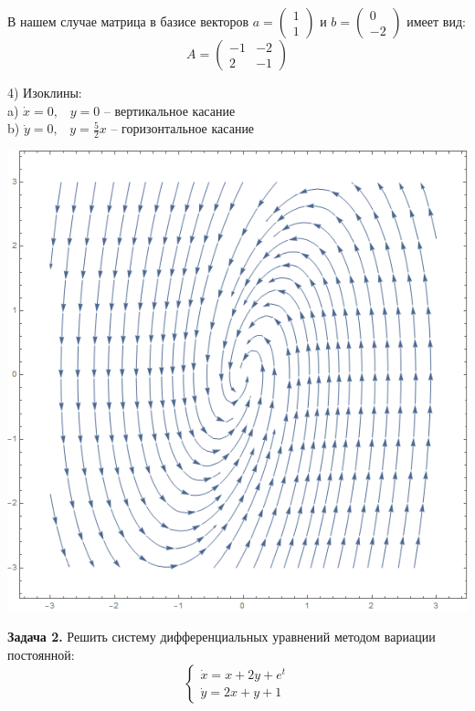 \documentclass[10pt]{report}
\begin{document}
В нашем случае матрица в базисе векторов $a=\left(
\begin{array}{c}
1\\
1
\end{array}\right)$ и 
$b=\left(
\begin{array}{c}
0\\
-2
\end{array}\right)$ имеет вид:
\[A=\left(
\begin{array}{cc}
-1 & -2 \\
2 & -1
\end{array}\right)\]

4) Изоклины:\\
a) $\dot{x}=0,\;\;\; y=0$ -- вертикальное касание\\
b) $\dot{y}=0,\;\;\; y=\frac 5 2x$ -- горизонтальное касание
\begin{center}
{\includegraphics[scale=0.48]{graph9.2.png}} 
\end{center}

\textbf{Задача 2.} Решить систему дифференциальных уравнений методом вариации постоянной:
\begin{equation}
\left\{
\begin{array}{lr}
\dot{x}=x+2y+e^t\\
\dot{y}=2x+y+1
\end{array}
\right.
\end{equation}
\end{document}

